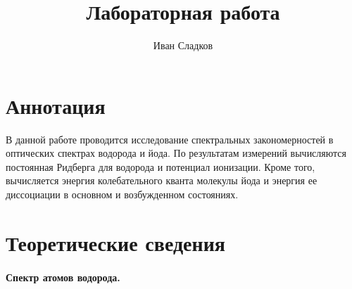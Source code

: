 \documentclass[a4paper]{article}
\title{Лабораторная работа \labnum \space \labname}
\author{Иван Сладков}
\begin{document}
	\maketitle
	\thispagestyle{empty}
	\section{Аннотация}
	В данной работе проводится исследование спектральных закономерностей в оптических спектрах водорода и йода. По результатам измерений вычисляются постоянная Ридберга для водорода и потенциал ионизации. Кроме того, вычисляется энергия колебательного кванта молекулы йода и энергия ее диссоциации в основном и возбужденном состояниях.
	
	\section{Теоретические сведения}
	
	\paragraph{Спектр атомов водорода.}
	
\end{document}
